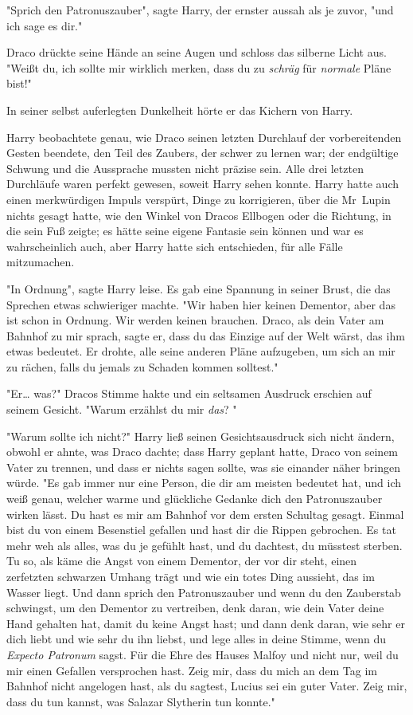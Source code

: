{"Sprich den Patronuszauber", sagte Harry, der ernster aussah als je zuvor, "und ich sage es dir."

Draco drückte seine Hände an seine Augen und schloss das silberne Licht aus. "Weißt du, ich sollte mir wirklich merken, dass du zu \emph{schräg} für \emph{normale} Pläne bist!"

In seiner selbst auferlegten Dunkelheit hörte er das Kichern von Harry.

Harry beobachtete genau, wie Draco seinen letzten Durchlauf der vorbereitenden Gesten beendete, den Teil des Zaubers, der schwer zu lernen war; der endgültige Schwung und die Aussprache mussten nicht präzise sein. Alle drei letzten Durchläufe waren perfekt gewesen, soweit Harry sehen konnte. Harry hatte auch einen merkwürdigen Impuls verspürt, Dinge zu korrigieren, über die Mr~Lupin nichts gesagt hatte, wie den Winkel von Dracos Ellbogen oder die Richtung, in die sein Fuß zeigte; es hätte seine eigene Fantasie sein können und war es wahrscheinlich auch, aber Harry hatte sich entschieden, für alle Fälle mitzumachen.

"In Ordnung", sagte Harry leise. Es gab eine Spannung in seiner Brust, die das Sprechen etwas schwieriger machte. "Wir haben hier keinen Dementor, aber das ist schon in Ordnung. Wir werden keinen brauchen. Draco, als dein Vater am Bahnhof zu mir sprach, sagte er, dass du das Einzige auf der Welt wärst, das ihm etwas bedeutet. Er drohte, alle seine anderen Pläne aufzugeben, um sich an mir zu rächen, falls du jemals zu Schaden kommen solltest."

"Er… was?" Dracos Stimme hakte und ein seltsamen Ausdruck erschien auf seinem Gesicht. "Warum erzählst du mir \emph{das}? "

"Warum sollte ich nicht?" Harry ließ seinen Gesichtsausdruck sich nicht ändern, obwohl er ahnte, was Draco dachte; dass Harry geplant hatte, Draco von seinem Vater zu trennen, und dass er nichts sagen sollte, was sie einander näher bringen würde. "Es gab immer nur eine Person, die dir am meisten bedeutet hat, und ich weiß genau, welcher warme und glückliche Gedanke dich den Patronuszauber wirken lässt. Du hast es mir am Bahnhof vor dem ersten Schultag gesagt. Einmal bist du von einem Besenstiel gefallen und hast dir die Rippen gebrochen. Es tat mehr weh als alles, was du je gefühlt hast, und du dachtest, du müsstest sterben. Tu so, als käme die Angst von einem Dementor, der vor dir steht, einen zerfetzten schwarzen Umhang trägt und wie ein totes Ding aussieht, das im Wasser liegt. Und dann sprich den Patronuszauber und wenn du den Zauberstab schwingst, um den Dementor zu vertreiben, denk daran, wie dein Vater deine Hand gehalten hat, damit du keine Angst hast; und dann denk daran, wie sehr er dich liebt und wie sehr du ihn liebst, und lege alles in deine Stimme, wenn du \emph{Expecto Patronum} sagst. Für die Ehre des Hauses Malfoy und nicht nur, weil du mir einen Gefallen versprochen hast. Zeig mir, dass du mich an dem Tag im Bahnhof nicht angelogen hast, als du sagtest, Lucius sei ein guter Vater. Zeig mir, dass du tun kannst, was Salazar Slytherin tun konnte."

}
